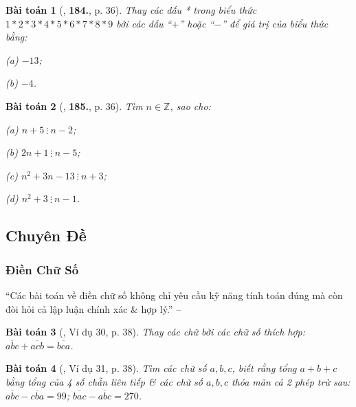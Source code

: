 \documentclass{article}
\numberwithin{equation}{section}
\newtheorem{baitoan}{Bài toán}[section]
\begin{document}
\begin{baitoan}[\cite{Binh_Toan_6_tap_1}, \textbf{184.}, p. 36]
	Thay các dấu * trong biểu thức $1*2*3*4*5*6*7*8*9$ bởi các dấu ``$+$'' hoặc ``$-$'' để giá trị của biểu thức bằng:
	\begin{enumerate*}
		\item[(a)] $-13$;
		\item[(b)] $-4$.
	\end{enumerate*}
\end{baitoan}

\begin{baitoan}[\cite{Binh_Toan_6_tap_1}, \textbf{185.}, p. 36]
	Tìm $n\in\mathbb{Z}$, sao cho:
	\begin{enumerate*}
		\item[(a)] $n + 5\ \vdots\ n - 2$;
		\item[(b)] $2n + 1\ \vdots\ n - 5$;
		\item[(c)] $n^2 + 3n - 13\ \vdots\ n + 3$;
		\item[(d)] $n^2 + 3\ \vdots\ n - 1$.
	\end{enumerate*}
\end{baitoan}


\subsection{Chuyên Đề}

\subsubsection{Điền Chữ Số}
``Các bài toán về điền chữ số không chỉ yêu cầu kỹ năng tính toán đúng mà còn đòi hỏi cả lập luận chính xác \& hợp lý.'' -- \cite[p. 38]{Binh_Toan_6_tap_1}

\begin{baitoan}[\cite{Binh_Toan_6_tap_1}, Ví dụ 30, p. 38]
	Thay các chữ bởi các chữ số thích hợp: $\overline{abc} + \overline{acb} = \overline{bca}$.
\end{baitoan}

\begin{baitoan}[\cite{Binh_Toan_6_tap_1}, Ví dụ 31, p. 38]
	Tìm các chữ số $a,b,c$, biết rằng tổng $a + b + c$ bằng tổng của 4 số chẵn liên tiếp \& các chữ số $a,b,c$ thỏa mãn cả 2 phép trừ sau: $\overline{abc} - \overline{cba} = 99$; $\overline{bac} - \overline{abc} = 270$.
\end{baitoan}
\end{document}
